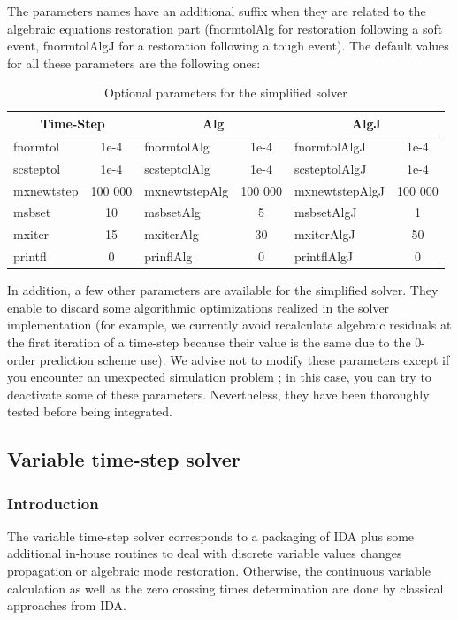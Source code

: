 \documentclass[a4paper, 12pt]{report}
\begin{document}
The parameters names have an additional suffix when they are related to the algebraic equations restoration part (fnormtolAlg for restoration following a soft event, fnormtolAlgJ for a restoration following a tough event). The default values for all these parameters are the following ones:

\begin{table}[h!]
\center
\begin{tabular}{lc | lc | lc}
\toprule
\multicolumn{2}{c}{\textbf{Time-Step}} &
\multicolumn{2}{c}{\textbf{Alg}} &
\multicolumn{2}{c}{\textbf{AlgJ}} \\
\midrule
fnormtol & 1e-4 & fnormtolAlg & 1e-4 & fnormtolAlgJ & 1e-4 \\
scsteptol & 1e-4 & scsteptolAlg & 1e-4 & scsteptolAlgJ & 1e-4 \\
mxnewtstep & 100 000 & mxnewtstepAlg & 100 000 & mxnewtstepAlgJ & 100 000 \\
msbset & 10 & msbsetAlg & 5 & msbsetAlgJ & 1 \\
mxiter & 15 & mxiterAlg & 30 & mxiterAlgJ & 50 \\
printfl & 0 & prinflAlg & 0 & printflAlgJ & 0 \\
\bottomrule
\end{tabular}
\caption{Optional parameters for the simplified solver}
\label{OptionalParameters}
\end{table}

In addition, a few other parameters are available for the simplified solver. They enable to discard some algorithmic optimizations realized in the solver implementation (for example, we currently avoid recalculate algebraic residuals at the first iteration of a time-step because their value is the same due to the 0-order prediction scheme use). We advise not to modify these parameters except if you encounter an unexpected simulation problem ; in this case, you can try to deactivate some of these parameters. Nevertheless, they have been thoroughly tested before being integrated.

\subsection{Variable time-step solver}

\subsubsection{Introduction}

The variable time-step solver corresponds to a packaging of \ac{IDA} plus some additional in-house routines to deal with discrete variable values changes propagation or algebraic mode restoration. Otherwise, the continuous variable calculation as well as the zero crossing times determination are done by classical approaches from \ac{IDA}. \\
\end{document}
